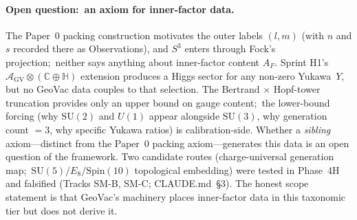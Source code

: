 \documentclass[aps,pra,twocolumn,superscriptaddress,longbibliography]{revtex4-2}
\begin{document}
\paragraph{Open question:\ an axiom for inner-factor data.}
The Paper~0 packing construction motivates the outer labels $(l, m)$
(with $n$ and $s$ recorded there as Observations), and $S^3$ enters
through Fock's projection;\ neither says anything about inner-factor
content $A_F$.  Sprint H1's $\mathcal{A}_{\mathrm{GV}}
\otimes (\mathbb{C} \oplus \mathbb{H})$ extension produces a Higgs
sector for any non-zero Yukawa~$Y$, but no GeoVac data couples to
that selection.
The Bertrand $\times$ Hopf-tower truncation provides only an upper
bound on gauge content;\ the lower-bound forcing (why $\mathrm{SU}(2)$
and $U(1)$ appear alongside $\mathrm{SU}(3)$, why generation count $= 3$,
why specific Yukawa ratios) is calibration-side.  Whether a
\emph{sibling} axiom---distinct from the Paper~0 packing axiom---generates
this data is an open question of the framework.  Two candidate routes
(charge-universal generation map;\ $\mathrm{SU}(5) / E_8 / \mathrm{Spin}(10)$
topological embedding) were tested in Phase~4H and falsified
(Tracks SM-B, SM-C; CLAUDE.md~\S 3).  The honest scope statement is
that GeoVac's machinery places inner-factor data in this taxonomic
tier but does not derive it.
\end{document}
